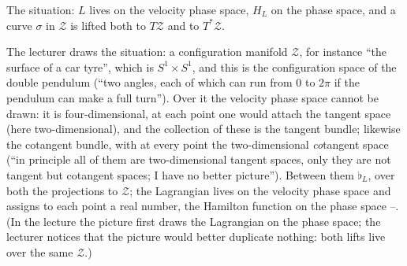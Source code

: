 \begin{paracol}{2}
\begin{nfigure}
\caption*{The situation: $L$ lives on the velocity phase space, $H_L$ on the phase space, and a curve $\sigma$ in $\mathcal Z$ is lifted both to $T\mathcal Z$ and to $T^*\mathcal Z$.}
\end{nfigure}

\begin{example}\label{ex:hq-torus}
The lecturer draws the situation: a configuration manifold $\mathcal Z$, for instance ``the surface of a car tyre'', which is $S^1\times S^1$, and this is the configuration space of the double pendulum (``two angles, each of which can run from $0$ to $2\pi$ if the pendulum can make a full turn''). Over it the velocity phase space cannot be drawn: it is four-dimensional, at each point one would attach the tangent space (here two-dimensional), and the collection of these is the tangent bundle; likewise the cotangent bundle, with at every point the two-dimensional \emph{co}tangent space (``in principle all of them are two-dimensional tangent spaces, only they are not tangent but cotangent spaces; I have no better picture''). Between them $\flat_L$, over both the projections to $\mathcal Z$; the Lagrangian lives on the velocity phase space and assigns to each point a real number, the Hamilton function on the phase space --. (In the lecture the picture first draws the Lagrangian on the phase space; the lecturer notices that the picture would better duplicate nothing: both lifts live over the same $\mathcal Z$.)


\end{example}
\end{paracol}
